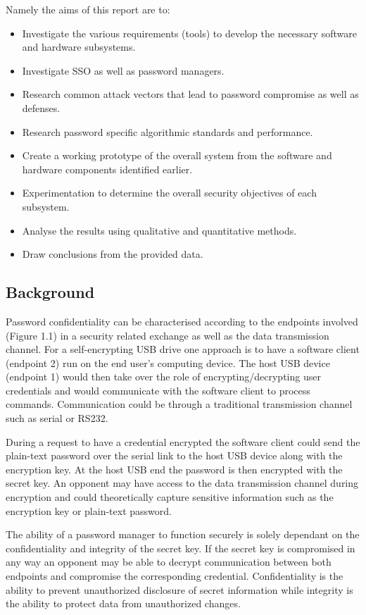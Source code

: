 Namely the aims of this report are to:
\begin{itemize}
  \item Investigate the various requirements (tools) to develop the necessary software and hardware subsystems.
   \item Investigate SSO as well as password managers.
  \item Research common attack vectors that lead to password compromise as well as defenses.
  \item Research password specific algorithmic standards and performance.
  \item Create a working prototype of the overall system from the software and hardware components identified earlier.
  \item Experimentation to determine the overall security objectives of each subsystem.
  \item Analyse the results using qualitative and quantitative methods.
  \item Draw conclusions from the provided data.
  
\end{itemize}

\subsection{Background}
Password confidentiality can be characterised according to the endpoints involved (Figure 1.1) in a security related exchange as well as the data transmission channel. For a self-encrypting USB drive one approach is to have a software client (endpoint 2) run on the end user's computing device. The host USB device (endpoint 1) would then take over the role of encrypting/decrypting user credentials and would communicate with the software client to process commands. Communication could be through a traditional transmission channel such as serial or RS232.

During a request to have a credential encrypted the software client could send the plain-text password over the serial link to the host USB device along with the encryption key. At the host USB end the password is then encrypted with the secret key. An opponent may have access to the data transmission channel during encryption and could theoretically capture sensitive information such as the encryption key or plain-text password. 

The ability of a password manager to function securely is solely dependant on the confidentiality and integrity of the secret key. If the secret key is compromised in any way an opponent may be able to decrypt communication between both endpoints and compromise the corresponding credential. Confidentiality is the ability to prevent unauthorized disclosure of secret information while integrity is the ability to protect data from unauthorized changes\cite{network_security}.

